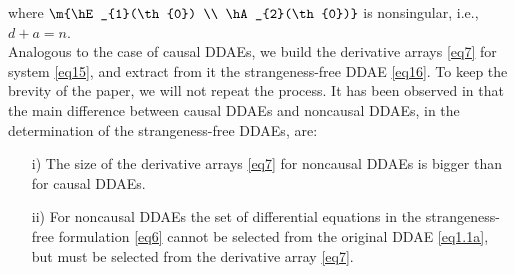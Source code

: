 \documentclass[final,reqno]{siamltex}
\begin{document}
\ee
%
where $\m{\hE_{1}(\th{0}) \\ \hA_{2}(\th{0})}$ is nonsingular, i.e.,  $d+a=n$.\\
Analogous to the case of causal DDAEs, we build the derivative arrays \eqref{eq7} for system \eqref{eq15}, and extract from it the 
strangeness-free DDAE \eqref{eq16}. To keep the brevity of the paper, we will not repeat the process.
It has been observed in \cite{HaM14} that the main difference between causal DDAEs and noncausal DDAEs, in the determination of the 
strangeness-free DDAEs, are:
\begin{enumerate}
 \item[i)] The size of the derivative arrays \eqref{eq7} for noncausal DDAEs is bigger than for causal DDAEs.
 \item[ii)] For noncausal DDAEs the set of differential equations in the strangeness-free formulation \eqref{eq6} cannot be selected from the original DDAE \eqref{eq1.1a}, but must be 
 selected from the derivative array \eqref{eq7}.
\end{enumerate}
\end{document}
